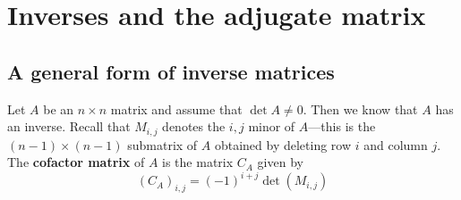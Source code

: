 \documentclass[12pt]{article}
\numberwithin{equation}{subsection}
\numberwithin{figure}{subsection}
\theoremstyle{note}
\begin{document}
\section{Inverses and the adjugate matrix}\label{ap-adjugate}

\subsection{A general form of inverse matrices}
Let $A$ be an $n\times n$ matrix and assume that $\det{A}\neq 0$. Then we know that $A$ has an inverse. Recall that $M_{i,j}$ denotes the $i,j$ minor of $A$---this is the $(n-1)\times (n-1)$ submatrix of $A$ obtained by deleting row $i$ and column $j$. The \textbf{cofactor matrix} of $A$ is the matrix $C_A$ given by \begin{equation} (C_A)_{i,j}= (-1)^{i+j} \det(M_{i,j})\end{equation}
\end{document}
